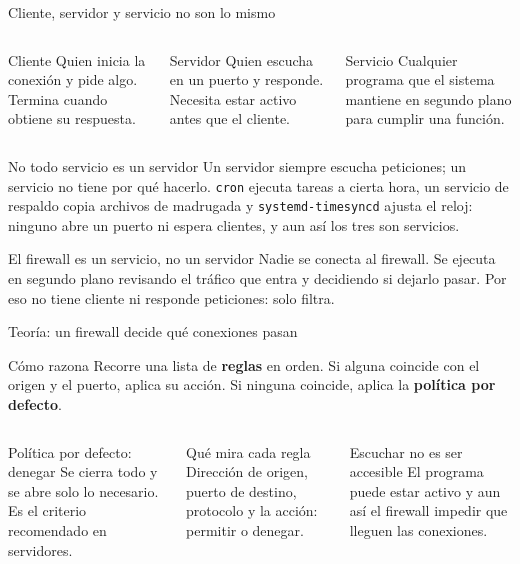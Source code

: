 \documentclass[aspectratio=169,10pt,c]{beamer}
\begin{document}
\begin{frame}{Cliente, servidor y servicio no son lo mismo}
\begin{columns}[T,onlytextwidth]
\begin{exampleblock}{Cliente}
\small Quien inicia la conexión y pide algo. Termina cuando obtiene su respuesta.
\end{exampleblock}
\begin{exampleblock}{Servidor}
\small Quien escucha en un puerto y responde. Necesita estar activo antes que el cliente.
\end{exampleblock}
\begin{exampleblock}{Servicio}
\small Cualquier programa que el sistema mantiene en segundo plano para cumplir una función.
\end{exampleblock}
\end{columns}
\begin{block}{No todo servicio es un servidor}
\small Un servidor siempre escucha peticiones; un servicio no tiene por qué hacerlo. \texttt{cron} ejecuta tareas a cierta hora, un servicio de respaldo copia archivos de madrugada y \texttt{systemd-timesyncd} ajusta el reloj: ninguno abre un puerto ni espera clientes, y aun así los tres son servicios.
\end{block}
\begin{exampleblock}{El firewall es un servicio, no un servidor}
\small Nadie se conecta al firewall. Se ejecuta en segundo plano revisando el tráfico que entra y decidiendo si dejarlo pasar. Por eso no tiene cliente ni responde peticiones: solo filtra.
\end{exampleblock}
\end{frame}

\begin{frame}{Teoría: un firewall decide qué conexiones pasan}
\begin{block}{Cómo razona}
\small Recorre una lista de \textbf{reglas} en orden. Si alguna coincide con el origen y el puerto, aplica su acción. Si ninguna coincide, aplica la \textbf{política por defecto}.
\end{block}
\begin{columns}[T,onlytextwidth]
\begin{exampleblock}{Política por defecto: denegar}
\small Se cierra todo y se abre solo lo necesario. Es el criterio recomendado en servidores.
\end{exampleblock}
\begin{exampleblock}{Qué mira cada regla}
\small Dirección de origen, puerto de destino, protocolo y la acción: permitir o denegar.
\end{exampleblock}
\begin{exampleblock}{Escuchar no es ser accesible}
\small El programa puede estar activo y aun así el firewall impedir que lleguen las conexiones.
\end{exampleblock}
\end{columns}
\end{frame}
\end{document}
